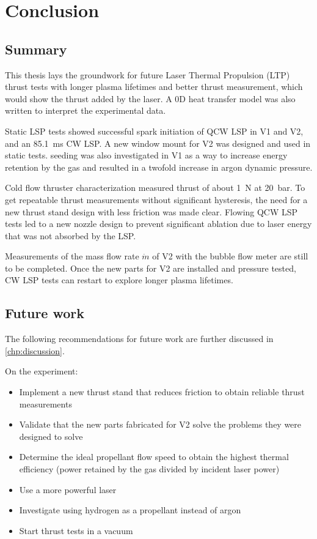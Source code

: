 \chapter{Conclusion}
    \section{Summary}

        This thesis lays the groundwork for future Laser Thermal Propulsion (LTP) thrust tests with longer plasma lifetimes and better thrust measurement, which would show the thrust added by the laser. A 0D heat transfer model was also written to interpret the experimental data.

        Static LSP tests showed successful spark initiation of QCW LSP in V1 and V2, and an \qty{85.1}{ms} CW LSP. A new window mount for V2 was designed and used in static tests.  seeding was also investigated in V1 as a way to increase energy retention by the gas and resulted in a twofold increase in argon dynamic pressure. 

        Cold flow thruster characterization measured thrust of about \qty{1}{N} at \qty{20}{bar}. To get repeatable thrust measurements without significant hysteresis, the need for a new thrust stand design with less friction was made clear. Flowing QCW LSP tests led to a new nozzle design to prevent significant ablation due to laser energy that was not absorbed by the LSP. 
        
        Measurements of the mass flow rate $\dot m$ of V2 with the bubble flow meter are still to be completed. Once the new parts for V2 are installed and pressure tested, CW LSP tests can restart to explore longer plasma lifetimes.

    \section{Future work}

        The following recommendations for future work are further discussed in \autoref{chp:discussion}.
        
        On the experiment:
        \begin{itemize}
            \item Implement a new thrust stand that reduces friction to obtain reliable thrust measurements
            \item Validate that the new parts fabricated for V2 solve the problems they were designed to solve
            \item Determine the ideal propellant flow speed to obtain the highest thermal efficiency (power retained by the gas divided by incident laser power)
            \item Use a more powerful laser
            \item Investigate using hydrogen as a propellant instead of argon
            \item Start thrust tests in a vacuum
        \end{itemize}

